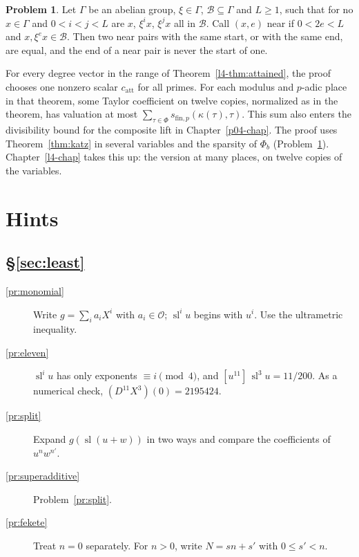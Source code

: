 \documentclass[reqno]{amsart}
\newcounter{chap}
\theoremstyle{definition}
\newtheorem{problem}{Problem}[section]
\theoremstyle{plain}
\newcommand{\Oc}{\mathcal{O}}
\newcommand{\sll}{\operatorname{sl}}
\begin{document}
\begin{problem}\label{pr:near-pairs}
Let \(\Gamma\) be an abelian group, \(\xi \in \Gamma\), \(\mathcal B \subseteq \Gamma\) and \(L \ge 1\), such that for no \(x \in \Gamma\) and \(0 < i < j < L\) are \(x\), \(\xi^ix\), \(\xi^jx\) all in \(\mathcal B\).  Call \((x, e)\) near if \(0 < 2e < L\) and \(x, \xi^ex \in \mathcal B\).  Then two near pairs with the same start, or with the same end, are equal, and the end of a near pair is never the start of one.
\end{problem}

For every degree vector in the range of Theorem~\ref{l4-thm:attained}, the proof chooses one nonzero scalar \(c_{\mathrm{att}}\) for all primes.  For each modulus and \(p\)-adic place in that theorem, some Taylor coefficient on twelve copies, normalized as in the theorem, has valuation at most \(\sum_{\tau\in\Phi}s_{\mathrm{fin},p}(\kappa(\tau),\tau)\).  This sum also enters the divisibility bound for the composite lift in Chapter~\ref{p04-chap}.  The proof uses Theorem~\ref{thm:katz} in several variables and the sparsity of \(\Phi_b\) (Problem~\ref{pr:near-pairs}).  Chapter~\ref{l4-chap} takes this up: the version at many places, on twelve copies of the variables.

\section*{Hints}

\subsection*{\S\ref{sec:least}}
\begin{description}
\item[\ref{pr:monomial}] Write \(g = \sum_i a_i X^i\) with \(a_i \in \Oc\); \(\sll^i u\) begins with \(u^i\).  Use the ultrametric inequality.
\item[\ref{pr:eleven}] \(\sll^i u\) has only exponents \(\equiv i \pmod 4\), and \([u^{11}]\,\sll^3 u = 11/200\).  As a numerical check, \((D^{11}X^3)(0) = 2195424\).
\item[\ref{pr:split}] Expand \(g(\sll(u + w))\) in two ways and compare the coefficients of \(u^n w^{n'}\).
\item[\ref{pr:superadditive}] Problem~\ref{pr:split}.
\item[\ref{pr:fekete}] Treat \(n = 0\) separately.  For \(n > 0\), write \(N = sn + s'\) with \(0 \le s' < n\).
\end{description}
\end{document}
